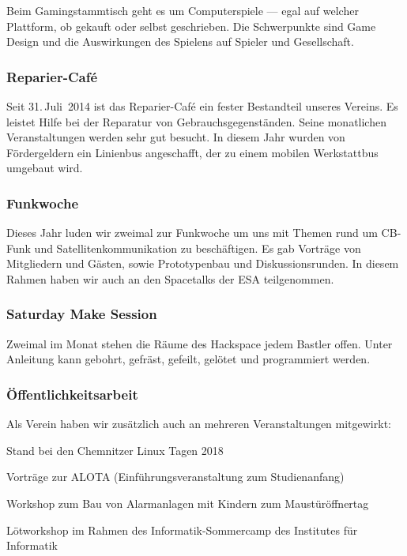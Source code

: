 \documentclass[ngerman]{scrartcl}
\begin{document}
Beim Gamingstammtisch geht es um Computerspiele — egal auf welcher
Plattform, ob gekauft oder selbst geschrieben. Die Schwerpunkte sind
Game Design und die Auswirkungen des Spielens auf Spieler und
Gesellschaft.

\subsubsection{Reparier-Café}

Seit 31.\,Juli~2014 ist das Reparier-Café ein fester Bestandteil unseres Vereins.
Es leistet Hilfe bei der Reparatur von Gebrauchsgegenständen.
Seine monatlichen Veranstaltungen werden sehr gut besucht. In diesem Jahr wurden
von Fördergeldern ein Linienbus angeschafft, der zu einem mobilen Werkstattbus
umgebaut wird.

\subsubsection{Funkwoche}

Dieses Jahr luden wir zweimal zur Funkwoche um uns mit Themen rund um CB-Funk und Satellitenkommunikation
zu beschäftigen. Es gab Vorträge von Mitgliedern und Gästen, sowie Prototypenbau und Diskussionsrunden.
In diesem Rahmen haben wir auch an den Spacetalks der ESA teilgenommen.

\subsubsection{Saturday Make Session}

Zweimal im Monat stehen die Räume des Hackspace jedem Bastler offen. Unter
Anleitung kann gebohrt, gefräst, gefeilt, gelötet und programmiert werden.

\subsubsection{Öffentlichkeitsarbeit}

Als Verein haben wir zusätzlich auch an mehreren Veranstaltungen mitgewirkt:
\begin{compactitem}
	\item Stand bei den Chemnitzer Linux Tagen 2018
	\item Vorträge zur ALOTA (Einführungsveranstaltung zum Studienanfang)
	\item Workshop zum Bau von Alarmanlagen mit Kindern zum Maustüröffnertag
	\item Lötworkshop im Rahmen des Informatik-Sommercamp des Institutes für Informatik
\end{compactitem}
\end{document}
